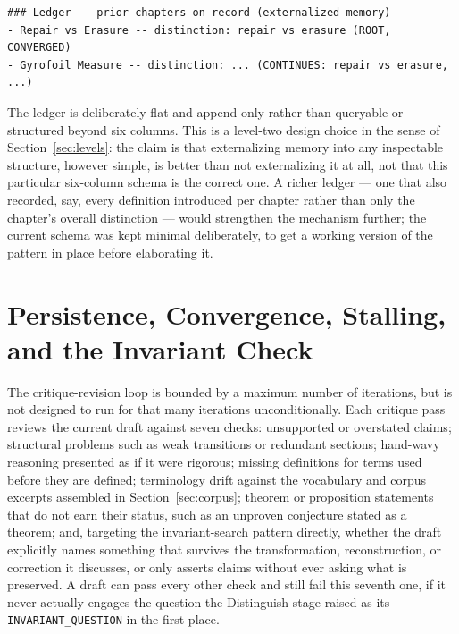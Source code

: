 \documentclass[11pt]{article}
\theoremstyle{definition}
\begin{document}
\begin{lstlisting}[caption={Ledger excerpt as injected into critique context}]
### Ledger -- prior chapters on record (externalized memory)
- Repair vs Erasure -- distinction: repair vs erasure (ROOT, CONVERGED)
- Gyrofoil Measure -- distinction: ... (CONTINUES: repair vs erasure, ...)
\end{lstlisting}

The ledger is deliberately flat and append-only rather than queryable
or structured beyond six columns. This is a level-two design choice in
the sense of Section~\ref{sec:levels}: the claim is that externalizing
memory into any inspectable structure, however simple, is better than
not externalizing it at all, not that this particular six-column schema
is the correct one. A richer ledger --- one that also recorded, say,
every definition introduced per chapter rather than only the chapter's
overall distinction --- would strengthen the mechanism further; the
current schema was kept minimal deliberately, to get a working version
of the pattern in place before elaborating it.

\section{Persistence, Convergence, Stalling, and the Invariant Check}
\label{sec:persist}

The critique-revision loop is bounded by a maximum number of
iterations, but is not designed to run for that many iterations
unconditionally. Each critique pass reviews the current draft against
seven checks: unsupported or overstated claims; structural problems
such as weak transitions or redundant sections; hand-wavy reasoning
presented as if it were rigorous; missing definitions for terms used
before they are defined; terminology drift against the vocabulary and
corpus excerpts assembled in Section~\ref{sec:corpus}; theorem or
proposition statements that do not earn their status, such as an
unproven conjecture stated as a theorem; and, targeting the
invariant-search pattern directly, whether the draft explicitly names
something that survives the transformation, reconstruction, or
correction it discusses, or only asserts claims without ever asking
what is preserved. A draft can pass every other check and still fail
this seventh one, if it never actually engages the question the
Distinguish stage raised as its \texttt{INVARIANT\_QUESTION} in the
first place.
\end{document}

